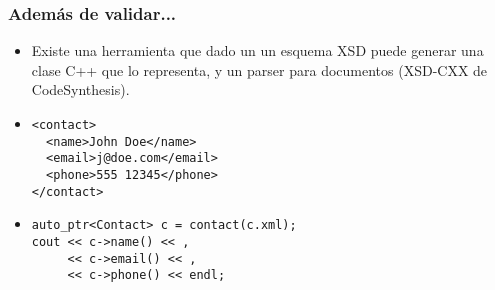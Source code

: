 \begin{frame}
\frametitle{Además de validar...}
\begin{itemize}

\item	Existe una herramienta que dado un un esquema XSD puede
	generar una clase C++ que lo representa, y un parser para
	documentos (XSD-CXX de CodeSynthesis).
	\pause

\item	\texttt{<contact>			\\
		~~<name>John Doe</name>		\\
		~~<email>j@doe.com</email>	\\
		~~<phone>555 12345</phone>	\\
		</contact>
	}
	\pause

\item	\texttt{auto\_ptr<Contact> c = contact(\dquote c.xml\dquote);	\\
		cout << c->name() << \dquote , \dquote 			\\
		~~~~~<< c->email() << \dquote , \dquote 		\\
		~~~~~<< c->phone() << endl;
}

\end{itemize}
\end{frame}
